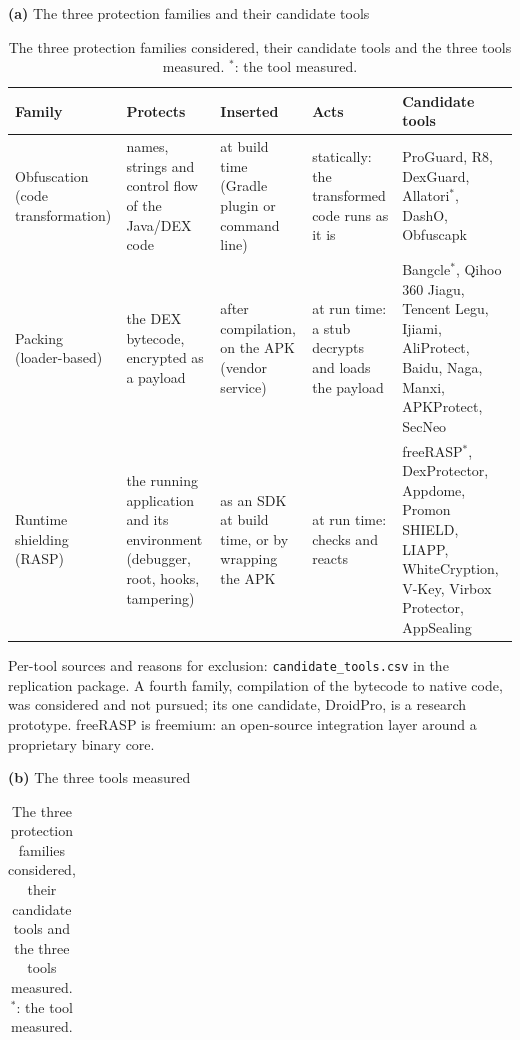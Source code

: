 \begin{table}[t]
\centering
\small
\caption{The three protection families considered, their candidate tools and the three tools measured. $^{*}$: the tool measured.}
\label{tab:tools}
\textbf{(a)} The three protection families and their candidate tools\par\smallskip
\begin{tabular}{>{\raggedright\arraybackslash}p{2.8cm}>{\raggedright\arraybackslash}p{3.2cm}>{\raggedright\arraybackslash}p{2.7cm}>{\raggedright\arraybackslash}p{2.8cm}>{\raggedright\arraybackslash}p{4.4cm}}
\toprule
\textbf{Family} & \textbf{Protects} & \textbf{Inserted} & \textbf{Acts} & \textbf{Candidate tools} \\
\midrule
Obfuscation (code transformation) & names, strings and control flow of the Java/DEX code & at build time (Gradle plugin or command line) & statically: the transformed code runs as it is & ProGuard, R8, DexGuard, Allatori$^{*}$, DashO, Obfuscapk \\
Packing (loader-based) & the DEX bytecode, encrypted as a payload & after compilation, on the APK (vendor service) & at run time: a stub decrypts and loads the payload & Bangcle$^{*}$, Qihoo 360 Jiagu, Tencent Legu, Ijiami, AliProtect, Baidu, Naga, Manxi, APKProtect, SecNeo \\
Runtime shielding (RASP) & the running application and its environment (debugger, root, hooks, tampering) & as an SDK at build time, or by wrapping the APK & at run time: checks and reacts & freeRASP$^{*}$, DexProtector, Appdome, Promon SHIELD, LIAPP, WhiteCryption, V-Key, Virbox Protector, AppSealing \\
\bottomrule
\end{tabular}
\par\smallskip\footnotesize Per-tool sources and reasons for exclusion: \texttt{candidate\_tools.csv} in the replication package. A fourth family, compilation of the bytecode to native code, was considered and not pursued; its one candidate, DroidPro, is a research prototype. freeRASP is freemium: an open-source integration layer around a proprietary binary core.
\par\bigskip\small
\textbf{(b)} The three tools measured\par\smallskip
\begin{tabular}{>{\raggedright\arraybackslash}p{1.3cm}>{\raggedright\arraybackslash}p{1.7cm}>{\raggedright\arraybackslash}p{2.6cm}>{\raggedright\arraybackslash}p{2.3cm}>{\raggedright\arraybackslash}p{3.8cm}>{\raggedright\arraybackslash}p{3.8cm}}

\end{tabular}
\end{table}
